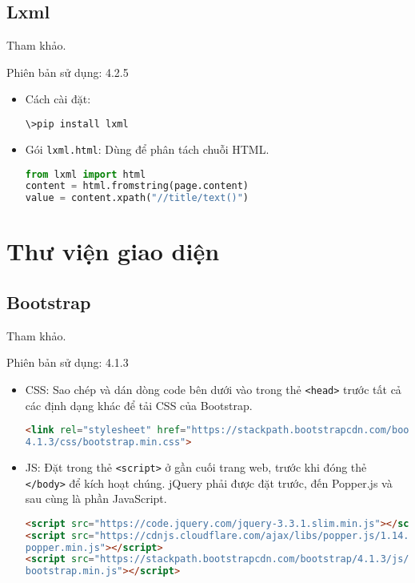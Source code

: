 \subsection{Lxml}
Tham khảo\cite{lxml}.
\\\par
Phiên bản sử dụng: 4.2.5
\begin{itemize}
	\item Cách cài đặt:
	\begin{lstlisting}[language=bash]
\>pip install lxml
	\end{lstlisting}
	\item Gói \texttt{lxml.html}: Dùng để phân tách chuỗi HTML.
	\begin{lstlisting}[language=Python]
from lxml import html
content = html.fromstring(page.content)
value = content.xpath("//title/text()")
	\end{lstlisting}
\end{itemize}
\section{Thư viện giao diện}
\subsection{Bootstrap}
Tham khảo\cite{bootstrap}.
\\\par
Phiên bản sử dụng: 4.1.3
\begin{itemize}
 	\item CSS: Sao chép và dán dòng code bên dưới vào trong thẻ \texttt{<head>} trước tất cả các định dạng khác để tải CSS của Bootstrap.
 	\begin{lstlisting}[language=HTML]
<link rel="stylesheet" href="https://stackpath.bootstrapcdn.com/bootstrap/
4.1.3/css/bootstrap.min.css">
	\end{lstlisting}
	\item JS: Đặt trong thẻ \texttt{<script>} ở gần cuối trang web, trước khi đóng thẻ \texttt{</body>} để kích hoạt chúng. jQuery phải được đặt trước, đến Popper.js và sau cùng là phần JavaScript.
	\begin{lstlisting}[language=HTML]
<script src="https://code.jquery.com/jquery-3.3.1.slim.min.js"></script>
<script src="https://cdnjs.cloudflare.com/ajax/libs/popper.js/1.14.3/umd/
popper.min.js"></script>
<script src="https://stackpath.bootstrapcdn.com/bootstrap/4.1.3/js/
bootstrap.min.js"></script>
	\end{lstlisting}
\end{itemize}

